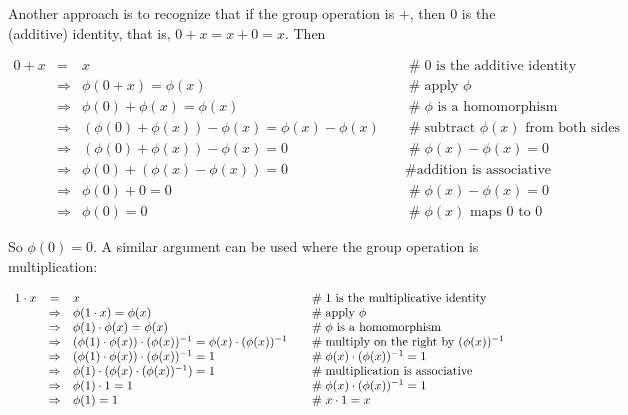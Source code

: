 \documentclass{article}
\theoremstyle{definition}
\begin{document}
\bigskip
\noindent
Another approach is to recognize that if the group operation is
$+$, then $0$ is the (additive) identity, that is, $0 + x = x + 0
= x$. Then

\begin{equation*}
\begin{array}{rcll}
0 + x 
&=& x                                                           &\quad \mathrel{\#} \text{$0$ is the additive identity} \\
&\Rightarrow& \phi(0  + x) = \phi(x)                            &\quad \mathrel{\#} \text{apply $\phi$} \\
&\Rightarrow& \phi(0) +  \phi(x) = \phi(x)                      &\quad \mathrel{\#} \phi \text{ is a homomorphism} \\
&\Rightarrow& (\phi(0) + \phi(x)) - \phi(x) = \phi(x) -\phi(x)  &\quad \mathrel{\#} \text{subtract $\phi(x)$ from both sides} \\
&\Rightarrow& (\phi(0) + \phi(x)) - \phi(x) = 0                 &\quad \mathrel{\#} \phi(x) -\phi(x) = 0 \\
&\Rightarrow& \phi(0) + (\phi(x) - \phi(x)) = 0                 &\quad \mathrel{\#} \text{addition is associative} \\
&\Rightarrow& \phi(0) + 0  = 0                                  &\quad \mathrel{\#} \phi(x) -\phi(x) = 0 \\
&\Rightarrow& \phi(0) = 0                                       &\quad \mathrel{\#} \phi(x) \text{ maps $0$ to $0$}
\end{array}
\end{equation*}

\bigskip
\noindent
So $\phi(0) = 0$. A similar argument can be used where the group
operation is multiplication: 

\begin{equation}
\begin{array}{rcll}
1 \cdot x 
&=& x
                &\quad \mathrel{\#} \text{$1$ is the multiplicative identity} \\
&\Rightarrow& \phi(1 \cdot x) = \phi(x)
                &\quad \mathrel{\#} \text{apply $\phi$} \\
&\Rightarrow& \phi(1) \cdot \phi(x) = \phi(x)
                &\quad \mathrel{\#} \phi \text{ is a homomorphism} \\
&\Rightarrow& (\phi(1) \cdot \phi(x)) \cdot  (\phi(x))^{-1} =
\phi(x) \cdot  (\phi(x))^{-1}
                &\quad \mathrel{\#} \text{multiply on the right by $ (\phi(x))^{-1}$} \\
&\Rightarrow& (\phi(1) \cdot \phi(x)) \cdot  (\phi(x))^{-1} = 1
                &\quad \mathrel{\#}\phi(x) \cdot  (\phi(x))^{-1}  = 1 \\
&\Rightarrow& \phi(1) \cdot (\phi(x) \cdot  (\phi(x))^{-1}) = 1
                &\quad \mathrel{\#} \text{multiplication is associative} \\
&\Rightarrow& \phi(1) \cdot 1 = 1
                &\quad \mathrel{\#} \phi(x) \cdot  (\phi(x))^{-1} = 1 \\
&\Rightarrow&  \phi(1) = 1
                &\quad \mathrel{\#}  x \cdot 1 = x
\end{array}
\label{eqn:1}
\end{equation}
\end{document}
